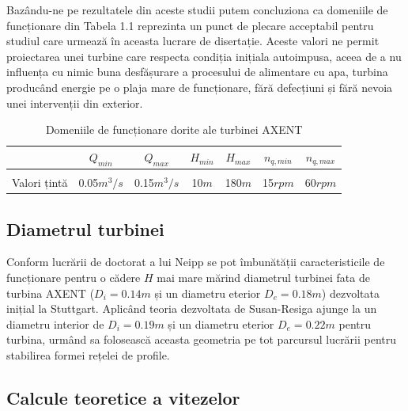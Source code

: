 Bazându-ne pe rezultatele din aceste studii putem concluziona ca domeniile de funcționare din Tabela 1.1 reprezinta un punct de plecare acceptabil pentru studiul care urmează în aceasta lucrare de disertație. Aceste valori ne permit proiectarea unei turbine care respecta condiția inițiala autoimpusa, aceea de a nu influența cu nimic buna desfășurare a procesului de alimentare cu apa, turbina producând energie pe o plaja mare de funcționare, fără defecțiuni și fără nevoia unei intervenții din exterior.\\

\begin{table}[ht]
\caption{Domeniile de funcționare dorite ale turbinei AXENT \cite{neipp2017zweistufige}}%
\centering

\begin{tabular}{ c | c | c | c | c | c | c }
           & $Q_{min}$          & $Q_{max}$          & $H_{min}$    & $H_{max}$     & $n_{q,min}$        & $n_{q,max}$ \\ \hline
&&&&&&\\[-0.5em]
Valori țintă  & 0.05$\si{m^3/s}$ & 0.15$\si{m^3/s}$ & 10$\si{m}$ & 180$\si{m}$ & 15$\si{rpm}$ & 60$\si{rpm}$ \\
\end{tabular}

\end{table}


\subsection{Diametrul turbinei}

Conform lucrării de doctorat a lui Neipp \cite{neipp2017zweistufige} se pot îmbunătății caracteristicile de funcționare pentru o cădere $H$ mai mare mărind diametrul turbinei fata de turbina AXENT ($D_i = 0.14\si{m}$ și un diametru eterior $D_e = 0.18\si{m}$) dezvoltata inițial la Stuttgart. Aplicând teoria dezvoltata de Susan-Resiga \cite{susanhub} ajunge la un diametru interior de $D_i = 0.19\si{m}$ și un diametru eterior $D_e = 0.22\si{m}$ pentru turbina, urmând sa folosească aceasta geometria pe tot parcursul lucrării pentru stabilirea formei rețelei de profile.

\clearpage

\subsection{Calcule teoretice a vitezelor}

